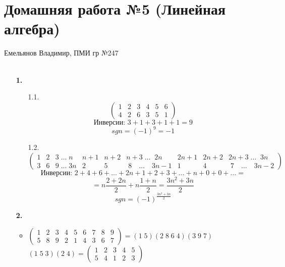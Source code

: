 \documentclass[a4paper]{article}
\newcommand{\mat}[1]{\begin{pmatrix} #1 \end{pmatrix}}
\renewcommand{\f}[2]{\frac{#1}{#2}}
\begin{document}
\section*{Домашняя работа №5 (Линейная алгебра)}
 {\large Емельянов Владимир, ПМИ гр №247}\\\\
\begin{enumerate}
      \item[\textbf{1.}] \indent \\
            \begin{enumerate}
                  \item[1.1.] $$\mat{1 & 2 & 3 & 4 & 5 & 6 \\ 4 & 2 & 6 & 3 & 5 & 1} $$
                        $$\text{Инверсии: } 3 + 1 + 3 + 1 + 1 = 9$$
                        $$sgn = (-1)^9 = -1$$

                  \item[1.2.] {\small $\begin{pmatrix}1 & 2 & 3 \; \ldots \; n & n+1 & n+2 & n+3 \; \ldots \;\; 2n \quad & 2n+1 & 2n+2 & 2n+3 \; \ldots \;\; 3n \;\; \\ 3 & 6 & 9 \; \ldots \; 3n & 2 & 5 & \; 8 \quad \ldots \quad 3n-1 &  1 & 4 & \; 7 \quad \ldots \quad 3n-2\end{pmatrix}$}
                        $$\text{Инверсии: } 2 + 4 + 6 +\dots+2n + 1+2+3 + \dots + n + 0 + 0 + \dots = $$
                        $$ = n\f{2+2n}{2}+n\f{1+n}{2} = \f{3n^2+3n}{2}$$
                        $$sgn = (-1)^{\f{3n^2+3n}{2}}$$
            \end{enumerate}

      \item[\textbf{2.}]\indent \\
            \begin{itemize}
                  \item $\mat{1 & 2 & 3 & 4 & 5 & 6 & 7 & 8 & 9 \\ 5 & 8 & 9 & 2 & 1 & 4 & 3 & 6 & 7}
                              = (1 \; 5)(2 \; 8 \; 6 \; 4)(3 \; 9 \; 7)$\\
                        $(1 \; 5 \; 3)(2 \; 4) = \mat{1 & 2 & 3 & 4 & 5 \\ 5 & 4 & 1 & 2 & 3}$


\end{itemize}
\end{enumerate}
\end{document}
